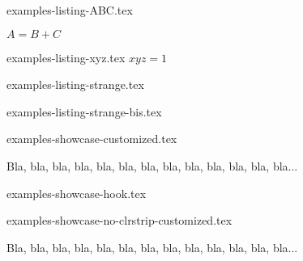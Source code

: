\begin{filecontents*}[overwrite]{examples-listing-ABC.tex}
\begin{tdoclatex}[sbs]
    $A = B + C$
\end{tdoclatex}
\end{filecontents*}


\begin{filecontents*}[overwrite]{examples-listing-xyz.tex}
$x y z = 1$
\end{filecontents*}


\begin{filecontents*}[overwrite]{examples-listing-strange.tex}
\begin{tdoclatex}
\end{tdoclatex}
\end{filecontents*}


\begin{filecontents*}[overwrite]{examples-listing-strange-bis.tex}
\begin{tdoclatex}
\end{tdoclatex}
\end{filecontents*}


\begin{filecontents*}[overwrite]{examples-showcase-customized.tex}
\begin{tdocshowcase}[before    = Mon début,
                     after     = Ma fin à moi,
                     colstripe = red,
                     coltext   = orange!75!black]
    Bla, bla, bla, bla, bla, bla, bla, bla, bla, bla, bla, bla, bla...
\end{tdocshowcase}
\end{filecontents*}


\begin{filecontents*}[overwrite]{examples-showcase-hook.tex}
\begin{tdocshowcase}
\end{tdocshowcase}
\end{filecontents*}


\begin{filecontents*}[overwrite]{examples-showcase-no-clrstrip-customized.tex}
\begin{tdocshowcase}[nostripe,
                     before    = Mon début,
                     after     = Ma fin à moi,
                     colstripe = green,
                     coltext   = purple]
    Bla, bla, bla, bla, bla, bla, bla, bla, bla, bla, bla, bla, bla...
\end{tdocshowcase}
\end{filecontents*}


